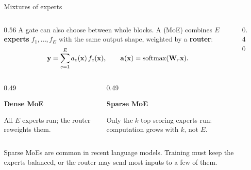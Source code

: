 \begin{frame}{Mixtures of experts}
	\small\setlength{\parskip}{3pt}\setlength{\abovedisplayskip}{5pt}\setlength{\belowdisplayskip}{5pt}
	\begin{columns}[c,onlytextwidth]
		\begin{column}{0.56\textwidth}
			A gate can also choose between whole blocks. A  (MoE) combines $E$ \textbf{experts} $f_1,\ldots,f_E$ with the same output shape, weighted by a \textbf{router}:
			\[
				\boldsymbol{\mathbf{y}}=\sum_{e=1}^{E}a_e(\boldsymbol{\mathbf{x}})\,f_e(\boldsymbol{\mathbf{x}}),
				\qquad
				\boldsymbol{\mathbf{a}}(\boldsymbol{\mathbf{x}})=\operatorname{softmax}(\boldsymbol{\mathbf{W}}_r\boldsymbol{\mathbf{x}}).
			\]
		\end{column}
		\begin{column}{0.40\textwidth}
			\centering
			\scalebox{0.9}{}
		\end{column}
	\end{columns}
	\medskip
	\begin{columns}[T,onlytextwidth]
		\begin{column}{0.49\textwidth}
			\begin{tcolorbox}[nndsblue,courseheight={mlp-moe}{0.20\textheight},boxsep=1mm,top=1mm,bottom=1mm]
				\textbf{\color{darkcerulean}Dense MoE}\par
				All $E$ experts run; the router reweights them.
			\end{tcolorbox}
		\end{column}
		\begin{column}{0.49\textwidth}
			\begin{tcolorbox}[nndsgreen,courseheight={mlp-moe}{0.20\textheight},boxsep=1mm,top=1mm,bottom=1mm]
				\textbf{\color{darkgreen}Sparse MoE}\par
				Only the $k$ top-scoring experts run: computation grows with $k$, not $E$.
			\end{tcolorbox}
		\end{column}
	\end{columns}
	\smallskip
	Sparse MoEs are common in recent language models. Training must keep the experts balanced, or the router may send most inputs to a few of them.
\end{frame}
